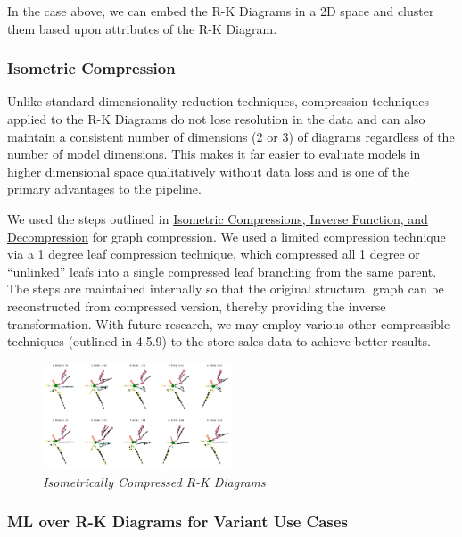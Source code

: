 In the case above, we can embed the R-K Diagrams in a 2D space and cluster them based upon attributes of the R-K Diagram.

\subsubsection{Isometric Compression}

Unlike standard dimensionality reduction techniques, compression techniques applied to the R-K Diagrams do not lose resolution in the data and can also maintain a consistent number of dimensions (2 or 3) of diagrams regardless of the number of model dimensions. This makes it far easier to evaluate models in higher dimensional space qualitatively without data loss and is one of the primary advantages to the pipeline.

We used the steps outlined in \hyperref[subsec:compression]{Isometric Compressions, Inverse Function, and Decompression} for graph compression. We used a limited compression technique via a 1 degree leaf compression technique, which compressed all 1 degree or ``unlinked'' leafs into a single compressed leaf branching from the same parent. The steps are maintained internally so that the original structural graph can be reconstructed from compressed version, thereby providing the inverse transformation. With future research, we may employ various other compressible techniques (outlined in 4.5.9) to the store sales data to achieve better results.

\begin{figure}[H]
	\centering
        \includegraphics[width=0.5\textwidth]{images/compressed_store_sales.png}
	\caption{\textit{Isometrically Compressed R-K Diagrams}}
	\label{fig:compresseion_example_fig}
\end{figure}


\subsubsection{ML over R-K Diagrams for Variant Use Cases}
\label{sec:classification}

